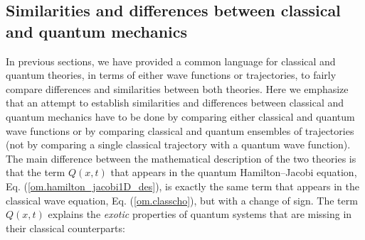 \documentclass[nofootinbib, secnumarabic, amsmath, nobibnotes,10pt,aps,pra]{revtex4-1}
\newcommand{\eref}[1]{Eq. (\ref{#1})}
\begin{document}
\subsection{Similarities and differences between classical and quantum mechanics}\label{om.sec_single.4}

In previous sections, we have provided a common language for
classical and quantum theories, in terms of either wave functions or
trajectories, to fairly compare differences and similarities between
both theories. Here we emphasize that an attempt to establish similarities and differences between classical and quantum mechanics have to be done by comparing either
classical and quantum wave functions or by comparing classical and quantum
ensembles of trajectories (not by comparing a single classical trajectory with a
quantum wave function). The main difference between the mathematical
description of the two theories is that the term \textit{$Q(x,t)$}
that appears in the quantum Hamilton--Jacobi equation,
\eref{om.hamilton_jacobi1D_des}, is exactly the same term that
appears in the classical wave equation, \eref{om.classcho}, but with a
change of sign. The term \textit{$Q(x,t)$} explains the
\textit{exotic} properties of quantum systems that are missing in
their classical counterparts:
\end{document}
